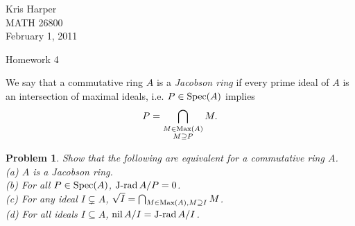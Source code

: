 \documentclass{article}
\newcommand{\spec}{\textup{Spec}}
\newcommand{\J}{\textup{J-rad}\,}
\newcommand{\nil}{\textup{nil}\,}
\newcommand{\Max}{\textup{Max}}
\newtheorem{problem}{Problem}
\begin{document}
\begin{flushright}
Kris Harper\\

MATH 26800\\

February 1, 2011
\end{flushright}

\begin{center}
Homework 4
\end{center}

We say that a commutative ring $A$ is a \emph{Jacobson ring} if every prime ideal of $A$ is an intersection of maximal ideals, i.e. $P \in \spec(A)$ implies
\[
P = \bigcap_{\substack{M \in \Max(A)\\ M \supseteq P}} M.
\]

\begin{problem}
\label{equiv}
Show that the following are equivalent for a commutative ring $A$.\\
(a) $A$ is a Jacobson ring.\\
(b) For all $P \in \spec(A)$, $\J A/P = 0$.\\
(c) For any ideal $I \subsetneq A$, $\sqrt{I} = \bigcap_{M \in \Max(A), M \supseteq I} M$.\\
(d) For all ideals $I \subseteq A$, $\nil A/I = \J A/I$.
\end{problem}
\end{document}
